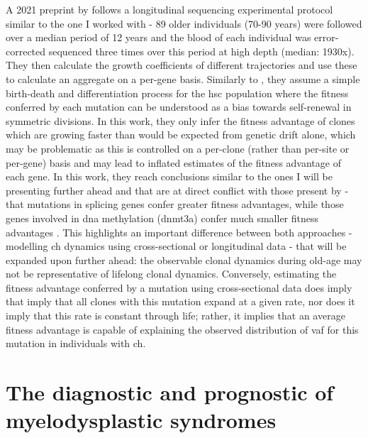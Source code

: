 A 2021 preprint by  follows a longitudinal sequencing experimental protocol similar to the one I worked with - 89 older individuals (70-90 years) were followed over a median period of 12 years and the blood of each individual was error-corrected sequenced three times over this period at high depth (median: 1930x). They then calculate the growth coefficients of different trajectories and use these to calculate an aggregate on a per-gene basis. Similarly to \cite{Watson2020-pz}, they assume a simple birth-death and differentiation process for the \ac{hsc} population where the fitness conferred by each mutation can be understood as a bias towards self-renewal in symmetric divisions. In this work, they only infer the fitness advantage of clones which are growing faster than would be expected from genetic drift alone, which may be problematic as this is controlled on a per-clone (rather than per-site or per-gene) basis and may lead to inflated estimates of the fitness advantage of each gene. In this work, they reach conclusions similar to the ones I will be presenting further ahead and that are at direct conflict with those present by \cite{Watson2020-pz} - that mutations in splicing genes confer greater fitness advantages, while those genes involved in \ac{dna} methylation (\ac{dnmt3a}) confer much smaller fitness advantages \cite{Robertson2021-sw}. This highlights an important difference between both approaches - modelling \ac{ch} dynamics using cross-sectional or longitudinal data - that will be expanded upon further ahead: the observable clonal dynamics during old-age may not be representative of lifelong clonal dynamics. Conversely, estimating the fitness advantage conferred by a mutation using cross-sectional data does imply that imply that all clones with this mutation expand at a given rate, nor does it imply that this rate is constant through life; rather, it implies that an average fitness advantage is capable of explaining the observed distribution of \ac{vaf} for this mutation in individuals with \ac{ch}.

\section{The diagnostic and prognostic of myelodysplastic syndromes}

